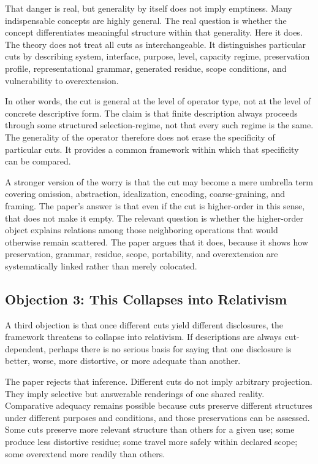 \documentclass[11pt]{article}
\begin{document}
That danger is real, but generality by itself does not imply emptiness. Many indispensable concepts are highly general. The real question is whether the concept differentiates meaningful structure within that generality. Here it does. The theory does not treat all cuts as interchangeable. It distinguishes particular cuts by describing system, interface, purpose, level, capacity regime, preservation profile, representational grammar, generated residue, scope conditions, and vulnerability to overextension.

In other words, the cut is general at the level of operator type, not at the level of concrete descriptive form. The claim is that finite description always proceeds through some structured selection-regime, not that every such regime is the same. The generality of the operator therefore does not erase the specificity of particular cuts. It provides a common framework within which that specificity can be compared.

A stronger version of the worry is that the cut may become a mere umbrella term covering omission, abstraction, idealization, encoding, coarse-graining, and framing. The paper's answer is that even if the cut is higher-order in this sense, that does not make it empty. The relevant question is whether the higher-order object explains relations among those neighboring operations that would otherwise remain scattered. The paper argues that it does, because it shows how preservation, grammar, residue, scope, portability, and overextension are systematically linked rather than merely colocated.

\subsection{Objection 3: This Collapses into Relativism}

A third objection is that once different cuts yield different disclosures, the framework threatens to collapse into relativism. If descriptions are always cut-dependent, perhaps there is no serious basis for saying that one disclosure is better, worse, more distortive, or more adequate than another.

The paper rejects that inference. Different cuts do not imply arbitrary projection. They imply selective but answerable renderings of one shared reality. Comparative adequacy remains possible because cuts preserve different structures under different purposes and conditions, and those preservations can be assessed. Some cuts preserve more relevant structure than others for a given use; some produce less distortive residue; some travel more safely within declared scope; some overextend more readily than others. \cite{chakravartty_scientific_realism_sep,scientific_pluralism_sep}
\end{document}
